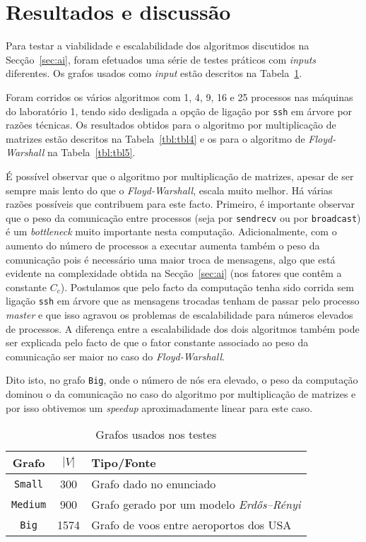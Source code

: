\documentclass[10pt,a4paper,oneside]{article}
\begin{document}
\section{Resultados e discussão}
\label{sec:res}
Para testar a viabilidade e escalabilidade dos algoritmos discutidos
na Secção~\ref{sec:ai}, foram efetuados uma série de testes práticos
com \textit{inputs} diferentes. Os grafos usados como \textit{input}
estão descritos na Tabela~\ref{tbl:tbl3}.

Foram corridos os vários algoritmos com 1, 4, 9, 16 e 25 processos nas
máquinas do laboratório 1, tendo sido desligada a opção de ligação por
{\tt ssh} em árvore por razões técnicas. Os resultados obtidos para o
algoritmo por multiplicação de matrizes estão descritos na
Tabela~\ref{tbl:tbl4} e os para o algoritmo de \textit{Floyd-Warshall}
na Tabela~\ref{tbl:tbl5}.

É possível observar que o algoritmo por multiplicação de matrizes,
apesar de ser sempre mais lento do que o \textit{Floyd-Warshall},
escala muito melhor. Há várias razões possíveis que contribuem para
este facto. Primeiro, é importante observar que o peso da comunicação
entre processos (seja por {\tt sendrecv} ou por {\tt broadcast}) é um
\textit{bottleneck} muito importante nesta computação. Adicionalmente,
com o aumento do número de processos a executar aumenta também o peso
da comunicação pois é necessário uma maior troca de mensagens, algo
que está evidente na complexidade obtida na Secção~\ref{sec:ai} (nos
fatores que contêm a constante $C_c$). Postulamos que pelo facto da
computação tenha sido corrida sem ligação {\tt ssh} em árvore que as
mensagens trocadas tenham de passar pelo processo \textit{master} e
que isso agravou os problemas de escalabilidade para números elevados
de processos. A diferença entre a escalabilidade dos dois algoritmos
também pode ser explicada pelo facto de que o fator constante
associado ao peso da comunicação ser maior no caso do
\textit{Floyd-Warshall}.

Dito isto, no grafo {\tt Big}, onde o número de nós era elevado, o
peso da computação dominou o da comunicação no caso do algoritmo por
multiplicação de matrizes e por isso obtivemos um \textit{speedup}
aproximadamente linear para este caso.

\begin{table}[t]
  \small
  \caption{Grafos usados nos testes}
  \label{tbl:tbl3}
  \centering
  \begin{tabular}{|c|c|l|}
    \hline
    Grafo & $|V|$ & Tipo/Fonte \\ \hline \hline
    {\tt Small}  &  300  & Grafo dado no enunciado \\ \hline
    {\tt Medium} &  900  & Grafo gerado por um modelo \textit{Erdős–Rényi} \\ \hline
    {\tt Big}    &  1574 & Grafo de voos entre aeroportos dos USA \cite{opsahl2011anchorage} \\ \hline
  \end{tabular}
\end{table}
\end{document}
